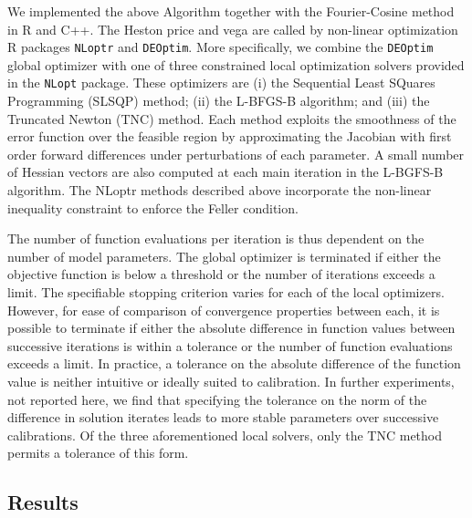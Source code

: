 \documentclass{article}
\begin{document}
We implemented the above Algorithm together with the Fourier-Cosine method in R and C++. The Heston price and vega are called by non-linear optimization R packages \verb|NLoptr| and \verb|DEOptim|\cite{Price2006,Ardia2011b}.  More specifically, we combine the \verb|DEOptim| global optimizer with  
one of three constrained local optimization solvers provided in the \verb|NLopt| package. These optimizers are (i) the Sequential Least SQuares Programming (SLSQP) method; (ii) the L-BFGS-B algorithm; and (iii) the Truncated Newton (TNC) method.  Each method exploits the smoothness of the error function over the feasible region by approximating the Jacobian with first order forward differences under perturbations of each parameter.  A small number of Hessian vectors are also computed at each main iteration in the L-BGFS-B algorithm.  The  NLoptr methods described above incorporate the non-linear inequality constraint to enforce the Feller condition.

The number of function evaluations per iteration is thus dependent on the number of model parameters. The global optimizer is terminated if either the objective function is below a threshold or the number of iterations exceeds a limit. The specifiable stopping criterion varies for each of the local optimizers. However, for ease of comparison of convergence properties between each,  it is possible to terminate if either the absolute difference in function values  between successive iterations is within a tolerance or the number of function evaluations exceeds a limit.  In practice, a tolerance on the absolute difference of the function value is neither intuitive or ideally suited to calibration.  In further experiments, not reported here, we find that specifying the tolerance on the norm of the difference in solution iterates leads to more stable parameters over successive calibrations. Of the three aforementioned local solvers, only the TNC method permits a tolerance of this form. 
  
\subsection{Results}
\end{document}
